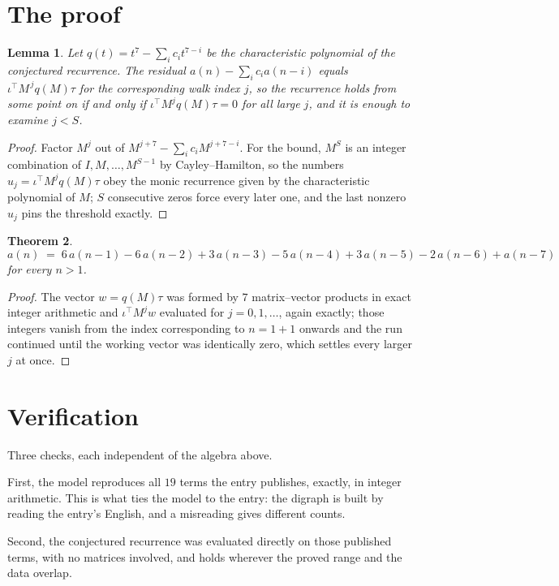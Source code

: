\documentclass[11pt,a4paper]{article}
\theoremstyle{plain}
\newtheorem{theorem}{Theorem}
\newtheorem{lemma}[theorem]{Lemma}
\theoremstyle{definition}
\begin{document}
\section{The proof}

\begin{lemma}\label{lem:crit}
Let $q(t)=t^{7}-\sum_i c_it^{7-i}$ be the characteristic polynomial of the
conjectured recurrence. The residual $a(n)-\sum_ic_ia(n-i)$ equals
$\iota^{\!\top}M^{\,j}q(M)\tau$ for the corresponding walk index $j$, so the recurrence
holds from some point on if and only if $\iota^{\!\top}M^{j}q(M)\tau=0$ for all large $j$,
and it is enough to examine $j<S$.
\end{lemma}

\begin{proof}
Factor $M^{j}$ out of $M^{j+7}-\sum_ic_iM^{j+7-i}$. For the bound, $M^{S}$
is an integer combination of $I,M,\dots,M^{S-1}$ by Cayley--Hamilton, so the numbers
$u_j=\iota^{\!\top}M^{j}q(M)\tau$ obey the monic recurrence given by the characteristic
polynomial of $M$; $S$ consecutive zeros force every later one, and the last nonzero $u_j$
pins the threshold exactly.
\end{proof}

\begin{theorem}
\[
a(n)\;=\;6\,a(n-1) - 6\,a(n-2) + 3\,a(n-3) - 5\,a(n-4) + 3\,a(n-5) - 2\,a(n-6) + a(n-7)
\]
for every $n>1$.
\end{theorem}

\begin{proof}
The vector $w=q(M)\tau$ was formed by $7$ matrix--vector products in exact integer
arithmetic and $\iota^{\!\top}M^{j}w$ evaluated for $j=0,1,\dots$, again exactly; those
integers vanish from the index corresponding to $n=1+1$ onwards and the run continued
until the working vector was identically zero, which settles every larger $j$ at once.
\end{proof}

\section{Verification}

Three checks, each independent of the algebra above.

First, the model reproduces all $19$ terms the entry publishes, exactly, in integer
arithmetic. This is what ties the model to the entry: the digraph is built by reading the
entry's English, and a misreading gives different counts.

Second, the conjectured recurrence was evaluated directly on those published terms, with no
matrices involved, and holds wherever the proved range and the data overlap.
\end{document}
